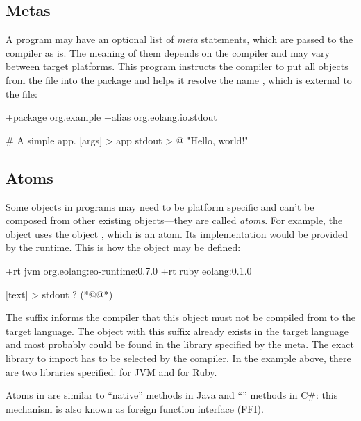\subsection{Metas}

A program may have an optional list of \emph{meta} statements,
which are passed to the compiler as is. The meaning of them depends
on the compiler and may vary
between target platforms. This program instructs the compiler
to put all objects from the file into the package 
and helps it resolve the name , which is external
to the file:

\begin{ffcode}
+package org.example
+alias org.eolang.io.stdout

# A simple app.
[args] > app
  stdout > @
    "Hello, world!\n"
\end{ffcode}

\subsection{Atoms}

Some objects in \eolang{} programs may need to be platform specific
and can't be composed from other existing objects---they are called
\emph{atoms}.
For example, the object  uses the object ,
which is an atom. Its implementation would be provided by the
runtime. This is how the object may be defined:

\begin{ffcode}
+rt jvm org.eolang:eo-runtime:0.7.0
+rt ruby eolang:0.1.0

[text] > stdout ? (*@\label{ln:stdout}@*)
\end{ffcode}

The  suffix informs the compiler that this object must
not be compiled from \eolang{} to the target language. The object
with this suffix already exists in the target language and most
probably could be found in the library specified by the 
meta. The exact library to import has to be selected by the compiler.
In the example above, there are two libraries specified: for JVM and
for Ruby.

Atoms in \eolang{} are similar to ``native'' methods in Java
and ``'' methods in C\#: this mechanism is also
known as foreign function interface (FFI).
